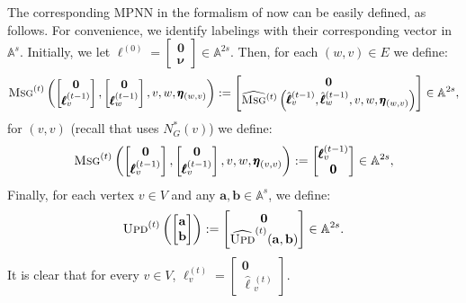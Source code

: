 \documentclass[10pt,a4paper]{article}
\theoremstyle{definition}
\begin{document}
The corresponding MPNN in the formalism of \citet{Loukas2019} now can be easily defined, as follows. For convenience, we identify labelings with their corresponding vector in $\mathbb{A}^s$.
Initially, we let $\pmb{\ell}^{(0)}=\left[\begin{smallmatrix}
	\mathbf{0} \\
     \pmb{\nu}\end{smallmatrix}\right]\in\mathbb{A}^{2s}$. Then,
for each $(w,v)\in E$ we define:
$$
\textsc{Msg}^{(t)}\left(\begin{bmatrix}
	\mathbf{0} \\
	\pmb{\ell}^{(t-1)}_v
\end{bmatrix},\begin{bmatrix}
	\mathbf{0} \\
	\pmb{\ell}^{(t-1)}_w
\end{bmatrix},v,w,\pmb{\eta}_{(w,v)}\right):=
\begin{bmatrix}
	\mathbf{0}\\
\widehat{\textsc{Msg}}{}^{(t)}\left(\hat{\pmb{\ell}}{}^{(t-1)}_v,\hat{\pmb{\ell}}{}^{(t-1)}_w,v,w,\pmb{\eta}_{(w,v)}\right)
\end{bmatrix}\in\mathbb{A}^{2s},
$$
for $(v,v)$ (recall that  \citet{Loukas2019} uses $N_G^*(v)$)  we define:
$$
\textsc{Msg}^{(t)}\left(\begin{bmatrix}
	\mathbf{0} \\
	\pmb{\ell}^{(t-1)}_v
\end{bmatrix},\begin{bmatrix}
	\mathbf{0} \\
	\pmb{\ell}^{(t-1)}_v
\end{bmatrix},v,w,\pmb{\eta}_{(v,v)}\right):=
\begin{bmatrix}
	\pmb{\ell}^{(t-1)}_v \\
	\pmb{0}
\end{bmatrix}\in\mathbb{A}^{2s},
$$
Finally, for each vertex $v\in V$ and any $\mathbf{a},\mathbf{b}\in\mathbb{A}^{s}$, we define:
$$\textsc{Upd}^{(t)}\left(\begin{bmatrix}\mathbf{a}\\
\mathbf{b}\end{bmatrix}\right):=\begin{bmatrix} \mathbf{0}\\
\widehat{\textsc{Upd}}^{(t)}(\mathbf{a},\mathbf{b})\end{bmatrix}\in\mathbb{A}^{2s}.
$$
It is clear that for every $v\in V$, $\pmb{\ell}^{(t)}_v=\left[\begin{smallmatrix}\mathbf{0}\\
\hat{\pmb{\ell}}{}^{(t)}_v\end{smallmatrix}\right]$.
\end{document}
